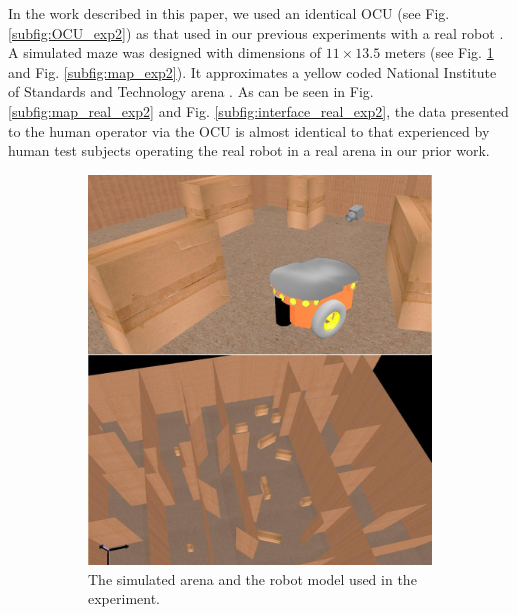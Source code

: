 \documentclass[a4paper,12pt,oneside,openright]{bhamthesis}
\begin{document}
In the work described in this paper, we used an identical OCU (see Fig. \ref{subfig:OCU_exp2}) as that used in our previous experiments with a real robot \cite{Chiou2015}. A simulated maze was designed with dimensions of  $11 \times 13.5$ meters (see Fig. \ref{subfig:arena_exp2} and Fig. \ref{subfig:map_exp2}). It approximates a yellow coded National Institute of Standards and Technology arena \cite{Jacoff2003a}. As can be seen in Fig. \ref{subfig:map_real_exp2} and Fig. \ref{subfig:interface_real_exp2}, the data presented to the human operator via the OCU is almost identical to that experienced by human test subjects operating the real robot in a real arena in our prior work.
	
\begin{figure}
	\centering
	\begin{subfigure}[b]{0.45\textwidth}
		\centering
		\includegraphics[width=\textwidth]{chapter4_fig/sim2.jpeg}
		\caption{The simulated arena and the robot model used in the experiment.}
		\label{subfig:arena_exp2}
	\end{subfigure}
	\hfill
	\begin{subfigure}[b]{0.35\textwidth}
		\centering

\end{subfigure}
\end{figure}
\end{document}
